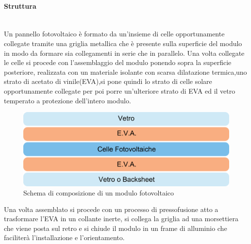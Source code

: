 \paragraph{Struttura}\mbox{}\\
Un pannello fotovoltaico è formato da un'insieme di celle opportunamente collegate tramite una griglia metallica che è presente sulla superficie del modulo in modo da formare sia collegamenti in serie che in parallelo. Una volta collegate le celle si procede con l'assemblaggio del modulo ponendo sopra la superficie posteriore, realizzata con un materiale isolante con scarsa dilatazione termica,uno strato di acetato di vinile(EVA),si pone quindi lo strato di celle solare opportunamente collegate per poi porre un'ulteriore strato di EVA ed il vetro temperato a protezione dell'intero modulo.\\
\begin{figure}[H]
    \centering
    \includegraphics[height=0.3\textwidth]{res/cap 3/composizione modulo}
    \caption{Schema di composizione di un modulo fotovoltaico}
\end{figure}\noindent
Una volta assemblato si procede con un processo di pressofusione atto a trasformare l'EVA in un collante inerte, si collega la griglia ad una morsettiera che viene posta sul retro e si chiude il modulo in un frame di alluminio che faciliterà l'installazione e l'orientamento.
